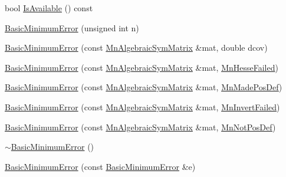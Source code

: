 \begin{DoxyCompactItemize}
\item 
bool \mbox{\hyperlink{classROOT_1_1Minuit2_1_1BasicMinimumError_a8f0c2bba7091677b5cd4438970ca8950}{Is\+Available}} () const
\item 
\mbox{\hyperlink{classROOT_1_1Minuit2_1_1BasicMinimumError_a7f1275c770648ade3a1f58f23e861783}{Basic\+Minimum\+Error}} (unsigned int n)
\item 
\mbox{\hyperlink{classROOT_1_1Minuit2_1_1BasicMinimumError_a1896b4c1b5594ca688e33de9bcbadbbc}{Basic\+Minimum\+Error}} (const \mbox{\hyperlink{namespaceROOT_1_1Minuit2_a9e74ad97f5537a2e80e52b04d98ecc6e}{Mn\+Algebraic\+Sym\+Matrix}} \&mat, double dcov)
\item 
\mbox{\hyperlink{classROOT_1_1Minuit2_1_1BasicMinimumError_a86d224646bf8e8db5c8054f1ffbb9276}{Basic\+Minimum\+Error}} (const \mbox{\hyperlink{namespaceROOT_1_1Minuit2_a9e74ad97f5537a2e80e52b04d98ecc6e}{Mn\+Algebraic\+Sym\+Matrix}} \&mat, \mbox{\hyperlink{classROOT_1_1Minuit2_1_1BasicMinimumError_1_1MnHesseFailed}{Mn\+Hesse\+Failed}})
\item 
\mbox{\hyperlink{classROOT_1_1Minuit2_1_1BasicMinimumError_a26edd7532675ec7f800a1b761fee1ce9}{Basic\+Minimum\+Error}} (const \mbox{\hyperlink{namespaceROOT_1_1Minuit2_a9e74ad97f5537a2e80e52b04d98ecc6e}{Mn\+Algebraic\+Sym\+Matrix}} \&mat, \mbox{\hyperlink{classROOT_1_1Minuit2_1_1BasicMinimumError_1_1MnMadePosDef}{Mn\+Made\+Pos\+Def}})
\item 
\mbox{\hyperlink{classROOT_1_1Minuit2_1_1BasicMinimumError_ad86ba685d218b1dabbfb90401825cc3f}{Basic\+Minimum\+Error}} (const \mbox{\hyperlink{namespaceROOT_1_1Minuit2_a9e74ad97f5537a2e80e52b04d98ecc6e}{Mn\+Algebraic\+Sym\+Matrix}} \&mat, \mbox{\hyperlink{classROOT_1_1Minuit2_1_1BasicMinimumError_1_1MnInvertFailed}{Mn\+Invert\+Failed}})
\item 
\mbox{\hyperlink{classROOT_1_1Minuit2_1_1BasicMinimumError_acfab85d4ea3043d0bca233fc654abeeb}{Basic\+Minimum\+Error}} (const \mbox{\hyperlink{namespaceROOT_1_1Minuit2_a9e74ad97f5537a2e80e52b04d98ecc6e}{Mn\+Algebraic\+Sym\+Matrix}} \&mat, \mbox{\hyperlink{classROOT_1_1Minuit2_1_1BasicMinimumError_1_1MnNotPosDef}{Mn\+Not\+Pos\+Def}})
\item 
\mbox{\hyperlink{classROOT_1_1Minuit2_1_1BasicMinimumError_abc20620bfacb0c914679cfa812e9b11d}{$\sim$\+Basic\+Minimum\+Error}} ()
\item 
\mbox{\hyperlink{classROOT_1_1Minuit2_1_1BasicMinimumError_a3552bc2f2c8fd9655b92c2f9ee5a5612}{Basic\+Minimum\+Error}} (const \mbox{\hyperlink{classROOT_1_1Minuit2_1_1BasicMinimumError}{Basic\+Minimum\+Error}} \&e)

\end{DoxyCompactItemize}
